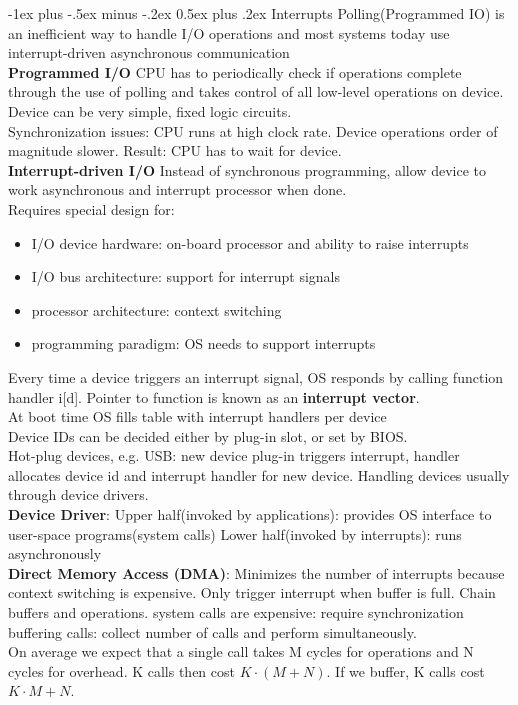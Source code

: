 \documentclass[letterpaper, 8pt]{extarticle}
\makeatletter
\renewcommand{\section}{\@startsection{section}{1}{0mm}%
                                {-1ex plus -.5ex minus -.2ex}%
                                {0.5ex plus .2ex}%
                                {\normalfont\normalsize\bfseries}}
\makeatother
\begin{document}
\begin{multicols*}{6}
    \section{Interrupts}
	Polling(Programmed IO) is an inefficient way to handle I/O operations and most systems today use interrupt-driven asynchronous communication\\
	\textbf{Programmed I/O} CPU has to periodically check if operations complete through the use of polling and takes control of all low-level operations on device. Device can be very simple, fixed logic circuits.\\
	Synchronization issues: CPU runs at high clock rate. Device operations order of magnitude slower. Result: CPU has to wait for device.\\
	\textbf{Interrupt-driven I/O} Instead of synchronous programming, allow device to work asynchronous and interrupt processor when done.\\
	Requires special design for: \\
	\begin{itemize}
	\item I/O device hardware: on-board processor and ability to raise interrupts
	\item I/O bus architecture: support for interrupt signals
	\item processor architecture: context switching 
	\item programming paradigm: OS needs to support interrupts
	\end{itemize}
	Every time a device triggers an interrupt signal, OS responds by calling function handler i[d]. Pointer to function is known as an \textbf{interrupt vector}.\\
	At boot time OS fills table with interrupt handlers per device\\
	Device IDs can be decided either by plug-in slot, or set by BIOS.\\
	Hot-plug devices, e.g. USB: new device plug-in triggers interrupt, handler allocates device id and interrupt handler for new device. Handling devices usually through device drivers.\\
	\textbf{Device Driver}: Upper half(invoked by applications): provides OS interface to user-space programs(system calls) Lower half(invoked by interrupts): runs asynchronously\\
	\textbf{Direct Memory Access (DMA)}: Minimizes the number of interrupts because context switching is expensive. Only trigger interrupt when buffer is full. Chain buffers and operations.
	system calls are expensive: require synchronization\\
	buffering calls: collect number of calls and perform simultaneously.\\
	On average we expect that a single call takes M cycles for operations and N cycles for overhead. K calls then cost $K \cdot (M + N)$. If we buffer, K calls cost $K \cdot M + N$.\\
    
\end{multicols*}
\end{document}
